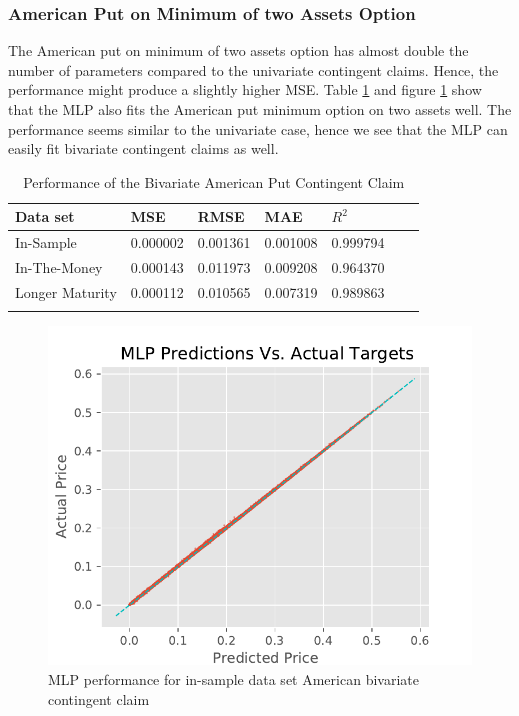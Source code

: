 \subsubsection{American Put on Minimum of two Assets Option}
The American put on minimum of two assets option has almost double the number of parameters compared to the univariate contingent claims. Hence, the performance might produce a slightly higher MSE. Table \ref{tab:AmerMinPerformanceComparision} and figure \ref{fig:MLPInSampleAmerMin} show that the MLP also fits the American put minimum option on two assets well. The performance seems similar to the univariate case, hence we see that the MLP can easily fit bivariate contingent claims as well. \\ 

\begin{table}[th]
\caption{Performance of the Bivariate American Put Contingent Claim}
\label{tab:AmerMinPerformanceComparision}
\centering
\begin{tabular}{l l l l l l l }
\toprule
\textbf{Data set} & \textbf{MSE} & \textbf{RMSE} & \textbf{MAE} & \textbf{$R^2$} \\
\midrule
In-Sample & 0.000002 & 0.001361 & 0.001008 & 0.999794\\
In-The-Money & 0.000143 & 0.011973 & 0.009208 & 0.964370\\
Longer Maturity & 0.000112 & 0.010565 & 0.007319 & 0.989863\\
\bottomrule\\
\end{tabular}
\end{table}

\begin{figure}[H]
\centering
\includegraphics{Figures/inSampleAmerMinP.pdf}
\decoRule
\caption[MLP Performance for In-sample Data Set American Put on minimum on two Assets]{MLP performance for in-sample data set American bivariate contingent claim}
\label{fig:MLPInSampleAmerMin}
\end{figure}

